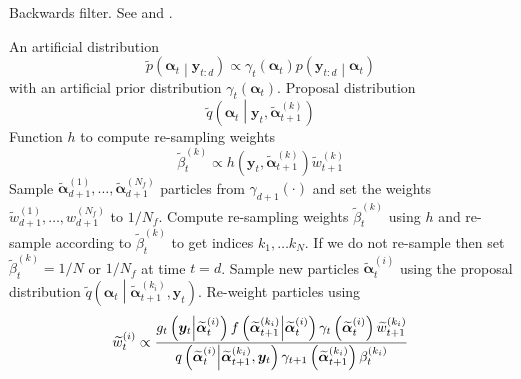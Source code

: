 \documentclass[notitlepage]{article}
\newcommand\StateX{\Statex\hspace{\algorithmicindent}}
\renewcommand{\vec}[1]{\bm{#1}}
\newcommand{\Lparen}[1]{\left( #1\right)}
\newcommand{\Cond}[2]{ #1 \middle\vert  #2}
\newcommand{\optor}[2]{#1\Lparen{#2}}
\newcommand{\optorC}[3]{\optor{#1}{\Cond{#2}{#3}}}
\newcommand{\pdensC}[2]{\optorC{p}{#1}{#2}}
\newcommand{\pdenstC}[2]{\optorC{\widetilde p}{#1}{#2}}
\newcommand{\gFunc}[3]{\optorC{g_{#3}}{#1}{#2}}
\newcommand{\fFunc}[2]{\optorC{f}{#1}{#2}}
\newcommand{\IDC}[2]{\optorC{q}{#1}{#2}}
\newcommand{\IDAproxC}[2]{\optorC{\widetilde{q}}{#1}{#2}}
\newcommand{\partic}[3]{#1_{#2}^{\Lparen{#3}}}
\newcommand{\particB}[3]{\widetilde{#1}_{#2}^{\Lparen{#3}}}
\newcommand{\nPart}{N}
\newcommand{\nPeriods}{d}
\begin{document}
\begin{algorithm}[H]
\caption{Backwards filter. See \cite{briers09} and \cite{fearnhead10}.}\label{alg:backward}
\begin{algorithmic}[1]\raggedright
\INPUT
\Statex An artificial distribution
\begin{equation}
	\pdenstC{\vec{\alpha}_t}{\vec{y}_{t:\nPeriods}} \propto \gamma_t \Lparen{\vec{\alpha}_t}\pdensC{\vec{y}_{t:\nPeriods}}{\vec{\alpha}_t}
\end{equation}
\Statex with an  artificial prior distribution $\gamma_t \Lparen{\vec{\alpha}_t}$. 
\Statex Proposal distribution  
$$\IDAproxC{\vec{\alpha}_t}{\vec{y}_t, \particB{\vec{\alpha}}{t + 1}{k}}$$
\Statex Function $h$ to compute re-sampling weights 
$$
\particB{\beta}{t}{k} \propto  h(
	\vec{y}_t, \particB{\vec{\alpha}}{t + 1}{k})
	\particB{w}{t + 1}{k}
$$
%
\State Sample $\particB{\vec{\alpha}}{\nPeriods+1}{1},\dots,\particB{\vec{\alpha}}{\nPeriods+1}{\nPart_f}$ particles from $\gamma_{\nPeriods+1}(\cdot)$ and set the weights $\particB{w}{\nPeriods + 1}{1},\dots,\partic{w}{\nPeriods+1}{\nPart_f}$ to $1 / \nPart_f$.
%
\For{$t=\nPeriods,\dots, 1$}
\State Compute re-sampling weights $\particB{\beta}{t}{k}$ using $h$ and re-sample according to $\particB{\beta}{t}{k}$ to get indices $k_1,\dots k_\nPart$. If we do not re-sample then set $\particB{\beta}{t}{k} = 1 / \nPart$ 
or $1 / \nPart_f$ at time $t = \nPeriods$.
\EndProcedure
%
\State Sample new particles $\particB{\vec{\alpha}}{t}{i}$ using the proposal distribution $\IDAproxC{\vec{\alpha}_t}{\particB{\vec{\alpha}}{t + 1}{k_i}, \vec{y}_t}$.
\EndProcedure
%
\State Re-weight particles using
\StateX \begin{equation}\label{eqn:backwardWeight}
	\particB{w}{t}{i} \propto \frac{
		\gFunc{\vec{y}_t}{\particB{\vec{\alpha}}{t}{i}}{t}
		\fFunc{\particB{\vec{\alpha}}{t + 1}{k_i}}{\particB{\vec{\alpha}}{t}{i}}
		\gamma_t\Lparen{\particB{\vec{\alpha}}{t}{i}}
		\particB{w}{t + 1}{k_i}
	}{ %
		\IDC{\particB{\vec{\alpha}}{t}{i}}{\particB{\vec{\alpha}}{t + 1}{k_i}, \vec{y}_t}
		\gamma_{t + 1}\Lparen{\particB{\vec{\alpha}}{t + 1}{k_i}}
		\partic{\beta}{t}{k_i}
	}
\end{equation}
\EndProcedure
\EndFor
\end{algorithmic}
\end{algorithm}

\newpage
\end{document}
